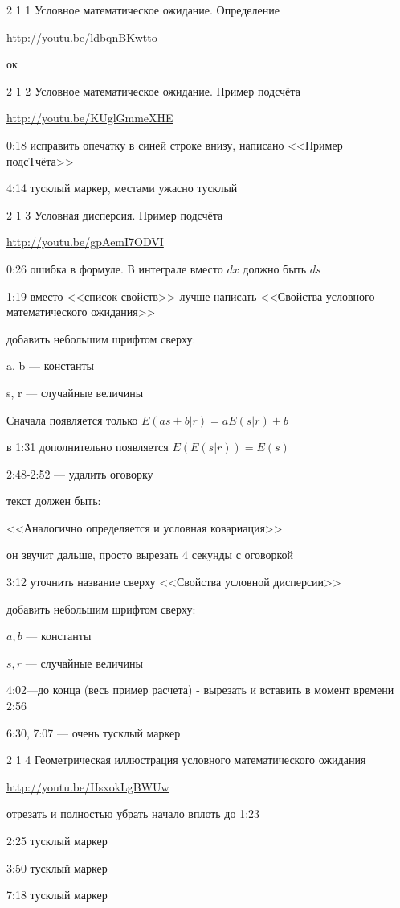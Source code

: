\documentclass[12pt,a4paper]{article}
\begin{document}
2 1 1 Условное математическое ожидание. Определение

\url{http://youtu.be/ldbqnBKwtto}

ок

2 1 2 Условное математическое ожидание. Пример подсчёта

\url{http://youtu.be/KUglGmmeXHE}

0:18 исправить опечатку в синей строке внизу, написано <<Пример подсТчёта>>

4:14 тусклый маркер, местами ужасно тусклый

2 1 3 Условная дисперсия. Пример подсчёта

\url{http://youtu.be/gpAemI7ODVI}

0:26 ошибка в формуле. В интеграле вместо $dx$ должно быть $ds$

1:19 вместо <<список свойств>> лучше написать <<Свойства условного математического ожидания>>

добавить небольшим шрифтом сверху:

a, b --- константы

s, r --- случайные величины

Сначала появляется только $E(as+b|r)=aE(s|r)+b$

в 1:31 дополнительно появляется $E(E(s|r))=E(s)$

2:48-2:52 --- удалить оговорку

текст должен быть:

<<Аналогично определяется и условная ковариация>>

он звучит дальше, просто вырезать 4 секунды с оговоркой

3:12 уточнить название сверху <<Свойства условной дисперсии>>

добавить небольшим шрифтом сверху:

$a, b$ --- константы

$s, r$ --- случайные величины

4:02---до конца (весь пример расчета) - вырезать и вставить в момент времени 2:56

6:30, 7:07 --- очень тусклый маркер

2 1 4 Геометрическая иллюстрация условного математического ожидания

\url{http://youtu.be/HsxokLgBWUw}

отрезать и полностью убрать начало вплоть до 1:23

2:25 тусклый маркер

3:50 тусклый маркер

7:18 тусклый маркер
\end{document}
